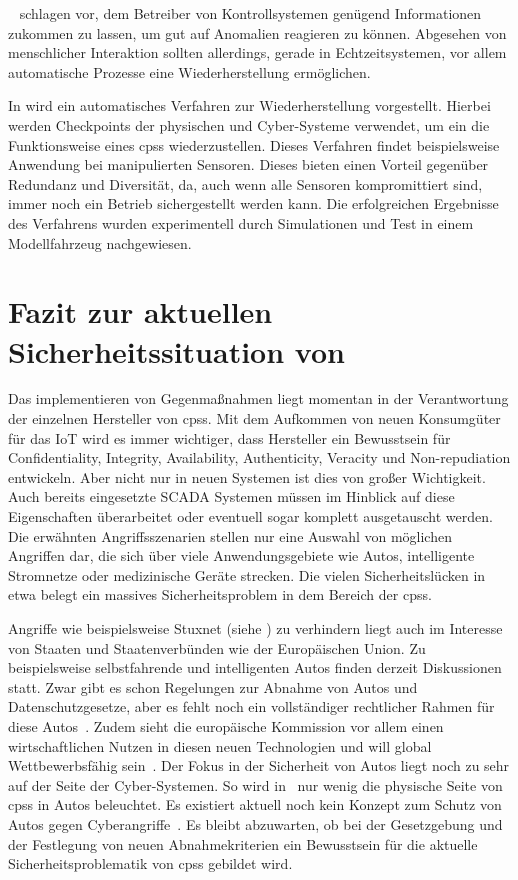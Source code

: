 \documentclass[final,bibliography=totocnumbered]{include/sikseminar}
\newcommand{\cps}{\glspl{cps}\xspace}
\begin{document}
    \citeauthor{CAS+09}~\cite{CAS+09} schlagen vor, dem Betreiber von Kontrollsystemen genügend Informationen zukommen zu lassen, um gut auf Anomalien reagieren zu können.
    Abgesehen von menschlicher Interaktion sollten allerdings, gerade in Echtzeitsystemen, vor allem automatische Prozesse eine Wiederherstellung ermöglichen.

    In \cite{KXW+18} wird ein automatisches Verfahren zur Wiederherstellung vorgestellt.
    Hierbei werden Checkpoints der physischen und Cyber-Systeme verwendet, um ein die Funktionsweise eines \cps wiederzustellen.
    Dieses Verfahren findet beispielsweise Anwendung bei manipulierten Sensoren.
    Dieses bieten einen Vorteil gegenüber Redundanz und Diversität, da, auch wenn alle Sensoren kompromittiert sind, immer noch ein Betrieb sichergestellt werden kann.
    Die erfolgreichen Ergebnisse des Verfahrens wurden experimentell durch Simulationen und Test in einem Modellfahrzeug nachgewiesen.

    \section{Fazit zur aktuellen Sicherheitssituation von }
    \label{sec:fazit-security-situation}
    Das implementieren von Gegenmaßnahmen liegt momentan in der Verantwortung der einzelnen Hersteller von \cps.
    Mit dem Aufkommen von neuen Konsumgüter für das IoT wird es immer wichtiger, dass Hersteller ein Bewusstsein für Confidentiality, Integrity, Availability, Authenticity, Veracity und Non-repudiation entwickeln.
    Aber nicht nur in neuen Systemen ist dies von großer Wichtigkeit.
    Auch bereits eingesetzte SCADA Systemen müssen im Hinblick auf diese Eigenschaften überarbeitet oder eventuell sogar komplett ausgetauscht werden.
    Die erwähnten Angriffsszenarien stellen nur eine Auswahl von möglichen Angriffen dar, die sich über viele Anwendungsgebiete wie Autos, intelligente Stromnetze oder medizinische Geräte strecken.
    Die vielen Sicherheitslücken in etwa \cite{HLL+17} belegt ein massives Sicherheitsproblem in dem Bereich der \cps.

    Angriffe wie beispielsweise Stuxnet (siehe ) zu verhindern liegt auch im Interesse von Staaten und Staatenverbünden wie der Europäischen Union.
    Zu beispielsweise selbstfahrende und intelligenten Autos finden derzeit Diskussionen statt.
    Zwar gibt es schon Regelungen zur Abnahme von Autos und Datenschutzgesetze, aber es fehlt noch ein vollständiger rechtlicher Rahmen für diese Autos~\cite{EuropeanCommission2018}.
    Zudem sieht die europäische Kommission vor allem einen wirtschaftlichen Nutzen in diesen neuen Technologien und will global Wettbewerbsfähig sein~\cite{EuropeanCommission2018}.
    Der Fokus in der Sicherheit von Autos liegt noch zu sehr auf der Seite der Cyber-Systemen.
    So wird in~\cite{EuropeanCommission2018} nur wenig die physische Seite von \cps in Autos beleuchtet.
    Es existiert aktuell noch kein Konzept zum Schutz von Autos gegen Cyberangriffe~\cite{EuropeanCommission2018}.
    Es bleibt abzuwarten, ob bei der Gesetzgebung und der Festlegung von neuen Abnahmekriterien ein Bewusstsein für die aktuelle Sicherheitsproblematik von \cps gebildet wird.
\end{document}
